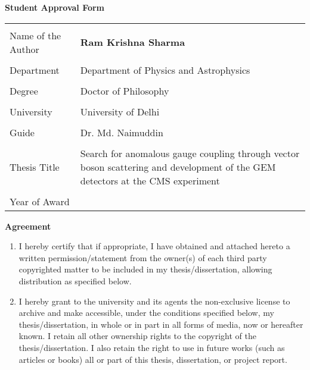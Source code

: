 \begin{center}
\textbf{\LARGE Student Approval Form}
\end{center}
\vspace{1cm}
%
%
%
\begin{tabular}{|l|p{12cm}|} \hline
 & \\ [-1em]
Name of the Author & {\bf Ram Krishna Sharma}\\ \hline
 & \\ [-1em]
Department & Department of Physics and Astrophysics\\ \hline
 & \\ [-1em]
Degree &  Doctor of Philosophy \\ \hline
 & \\ [-1em]
University & University of Delhi \\ \hline
 & \\ [-1em]
Guide & Dr. Md. Naimuddin \\ \hline
 & \\ [-1em]
Thesis Title & Search for anomalous gauge coupling through vector boson scattering and development of the GEM detectors at the CMS experiment\\ \hline
 & \\ [-1em]
Year of Award & \\ \hline
\end{tabular}
%
%
%
\vspace{0.5cm}
%
%
%
\begin{center}
\textbf{Agreement} \\
\end{center}
\vspace{0.5cm}
\begin{enumerate}
\item I hereby certify that if appropriate, I have obtained and attached hereto a written permission/statement from the owner(s) of each third party copyrighted matter to be included in my thesis/dissertation, allowing distribution as specified below.
\item I hereby grant to the university and its agents the non-exclusive license to archive and make accessible, under the conditions specified below, my thesis/dissertation, in whole or in part in all forms of media, now or hereafter known. I retain all other ownership rights to the copyright of the thesis/dissertation. I also retain the right to use in future works (such as articles or books) all or part of this thesis, dissertation, or project report.
\end{enumerate}
